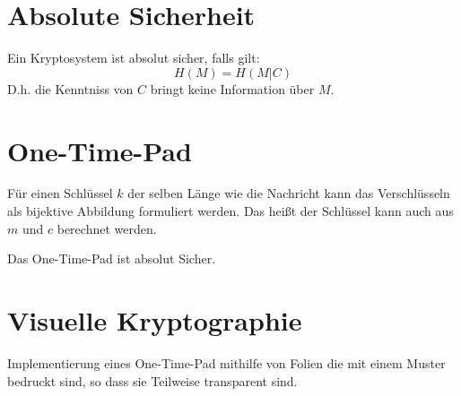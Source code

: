 \section{Absolute Sicherheit}
Ein Kryptosystem ist absolut sicher, falls gilt:
\begin{equation}
    H(M) = H(M|C)
\end{equation}
D.h. die Kenntniss von $C$ bringt keine Information über $M$.

\section{One-Time-Pad}
Für einen Schlüssel $k$ der selben Länge wie die Nachricht kann das Verschlüsseln als 
bijektive Abbildung formuliert werden. Das heißt der Schlüssel kann auch aus
$m$ und $c$ berechnet werden.

Das One-Time-Pad ist absolut Sicher.

\section{Visuelle Kryptographie}
Implementierung eines One-Time-Pad mithilfe von Folien die mit einem Muster bedruckt sind, so dass sie Teilweise transparent sind.
